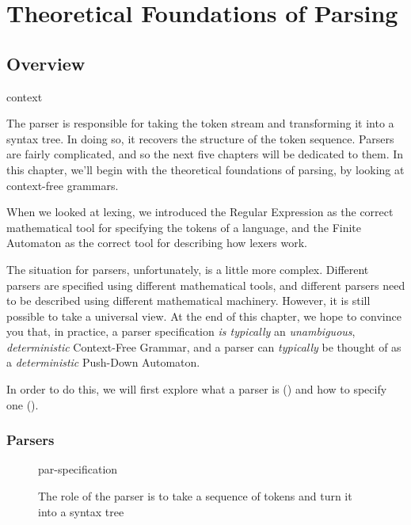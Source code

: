 \chapter{Theoretical Foundations of Parsing}\label{chapter:parse-foundations}

\section{Overview}
\begin{center}
    {context}
\end{center}

The parser is responsible for taking the token stream and transforming it into a syntax tree. In doing so, it recovers the structure of the token sequence. Parsers are fairly complicated, and so the next five chapters will be dedicated to them. In this chapter, we'll begin with the theoretical foundations of parsing, by looking at context-free grammars.

When we looked at lexing, we introduced the Regular Expression as the correct mathematical tool for specifying the tokens of a language, and the Finite Automaton as the correct tool for describing how lexers work.

The situation for parsers, unfortunately, is a little more complex. Different parsers are specified using different mathematical tools, and different parsers need to be described using different mathematical machinery. However, it is still possible to take a universal view. At the end of this chapter, we hope to convince you that, in practice, a parser specification \textit{is typically} an \textit{unambiguous}, \textit{deterministic} Context-Free Grammar, and a parser can \textit{typically} be thought of as a \textit{deterministic} Push-Down Automaton. 

In order to do this, we will first explore what a parser is () and how to specify one ().

\subsection{Parsers}\label{section:parsers}
\begin{figure}[h]
    \centering
    {par-specification}
    \caption{The role of the parser is to take a sequence of tokens and turn it into a syntax tree}
    \label{fig:par-specification}
\end{figure}

